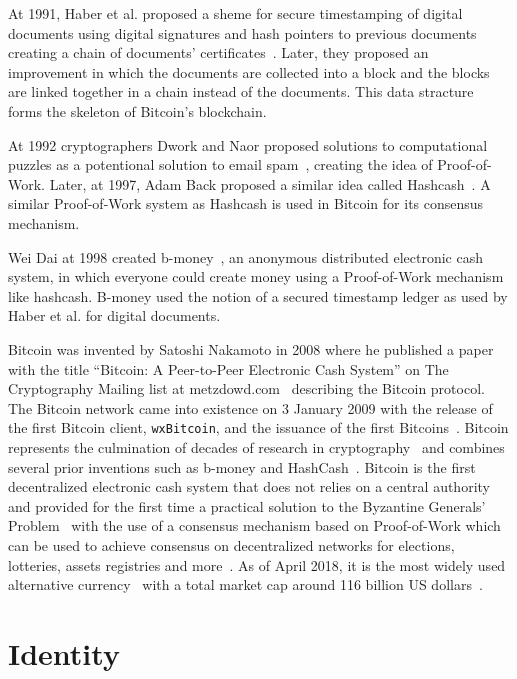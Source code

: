 At 1991, Haber et al. proposed a sheme for secure timestamping of digital documents using digital signatures and hash pointers to previous documents
creating a chain of documents' certificates~\cite{Haber1991}. Later, they proposed an improvement in which the documents are collected into a block and
the blocks are linked together in a chain instead of the documents. This data stracture forms the skeleton of Bitcoin's blockchain.

At 1992 cryptographers Dwork and Naor proposed solutions to computational puzzles as a potentional solution to email spam~\cite{Dwork1993},
creating the idea of Proof-of-Work. Later, at 1997, Adam Back proposed a similar idea called Hashcash~\cite{hash_cash}.
A similar Proof-of-Work system as Hashcash is used in Bitcoin for its consensus mechanism.

Wei Dai at 1998 created b-money~\cite{b_money}, an anonymous distributed electronic cash system, in which everyone
could create money using a Proof-of-Work mechanism like hashcash. B-money used the notion of a secured timestamp ledger as used by Haber et al. for digital documents.

Bitcoin was invented by Satoshi Nakamoto in 2008 where he published a paper with the title ``Bitcoin: A Peer-to-Peer Electronic Cash System'' on The Cryptography Mailing list at metzdowd.com~\cite{satoshi_mailing_list} describing the Bitcoin protocol. The Bitcoin network came into existence on 3 January 2009 with the release of the first Bitcoin client, \verb|wxBitcoin|, and the issuance of the first Bitcoins~\cite{btc_client, btc_first_block}. Bitcoin represents the culmination of decades of research in cryptography~\cite{antonopoulos2014mastering} and combines several prior inventions such as b-money and HashCash~\cite{antonopoulos2014mastering}. Bitcoin is the first decentralized electronic cash system that does not relies on a central authority and
provided for the first time a practical solution to the Byzantine Generals' Problem~\cite{byzantine_fault_tolerance} with the use of a consensus mechanism
based on Proof-of-Work which can be used to achieve consensus on decentralized networks for elections, lotteries, assets registries and more~\cite{antonopoulos2014mastering}. As of April 2018, it is the most widely used alternative currency~\cite{10.1007/978-3-642-39884-1_2} with a total market cap around 116 billion US dollars~\cite{btc_cap}.

\section{Identity}\label{blockchain:identity}

